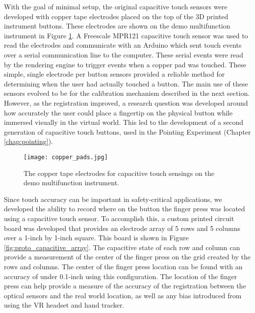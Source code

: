 With the goal of minimal setup, the original capacitive touch sensors were developed with copper tape electrodes placed on the top of the 3D printed instrument buttons.
These electrodes are shown on the demo multifunction instrument in Figure \ref{fig:copper_pads}.
A Freescale MPR121 capacitive touch sensor was used to read the electrodes and communicate with an Arduino which sent touch events over a serial communication line to the computer.
These serial events were read by the rendering engine to trigger events when a copper pad was touched.
These simple, single electrode per button sensors provided a reliable method for determining when the user had actually touched a button.
The main use of these sensors evolved to be for the calibration mechanism described in the next section.
However, as the registration improved, a research question was developed around how accurately the user could place a fingertip on the physical button while immersed visually in the virtual world.
This led to the development of a second generation of capacitive touch buttons, used in the Pointing Experiment (Chapter \ref{chap:pointing}).

\begin{figure}
    \centering
    \texttt{[image: copper\_pads.jpg]}
    \caption{The copper tape electrodes for capacitive touch sensings on the demo multifunction instrument.}
    \label{fig:copper_pads}
\end{figure}

Since touch accuracy can be important in safety-critical applications, we developed the ability to record where on the button the finger press was located using a capacitive touch sensor.
To accomplish this, a custom printed circuit board was developed that provides an electrode array of 5 rows and 5 columns over a 1-inch by 1-inch square.
This board is shown in Figure \ref{fig:proto_capacitive_array}.%
The capacitive state of each row and column can provide a measurement of the center of the finger press on the grid created by the rows and columns.
The center of the finger press location can be found with an accuracy of under 0.1-inch using this configuration.
The location of the finger press can help provide a measure of the accuracy of the registration between the optical sensors and the real world location, as well as any bias introduced from using the VR headset and hand tracker.

